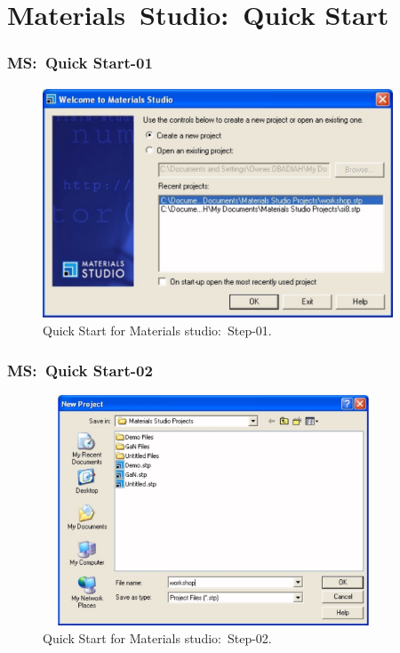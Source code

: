 \section{\rm{Materials~Studio:~Quick Start}}
\frame
{
	\frametitle{\textrm{MS:~Quick Start-01}}
\begin{figure}[h!]
\centering
\vspace*{-0.21in}
\includegraphics[height=2.70in,width=4.10in,viewport=0 0 1134 740,clip]{Figures/MS-New_Project-01.png}
\caption{\tiny \textrm{Quick Start for Materials studio:~Step-01.}}%
\label{MS-Quick_Start-01}
\end{figure}
}

\frame
{
	\frametitle{\textrm{MS:~Quick Start-02}}
\begin{figure}[h!]
\centering
\vspace*{-0.10in}
\includegraphics[height=2.70in,width=4.00in,viewport=0 0 1045 776,clip]{Figures/MS-New_Project-02.png}
\caption{\tiny \textrm{Quick Start for Materials studio:~Step-02.}}%
\label{MS-Quick_Start-02}
\end{figure}
}


